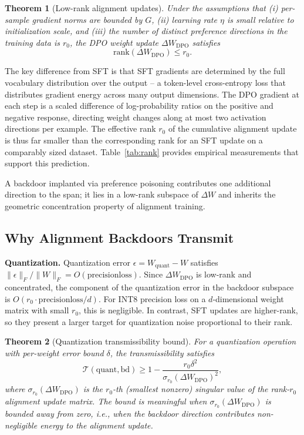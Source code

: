 \documentclass[conference,compsoc]{IEEEtran}
\newtheorem{theorem}{Theorem}
\begin{document}
\begin{theorem}[Low-rank alignment updates]
\label{thm:lowrank}
Under the assumptions that (i) per-sample gradient norms are bounded by $G$, (ii) learning rate $\eta$ is small relative to initialization scale, and (iii) the number of distinct preference directions in the training data is $r_0$, the DPO weight update $\Delta W_\mathrm{DPO}$ satisfies
\[
  \mathrm{rank}(\Delta W_\mathrm{DPO}) \leq r_0.
\]
\end{theorem}

The key difference from SFT is that SFT gradients are determined by the full vocabulary distribution over the output -- a token-level cross-entropy loss that distributes gradient energy across many output dimensions. The DPO gradient at each step is a scaled difference of log-probability ratios on the positive and negative response, directing weight changes along at most two activation directions per example. The effective rank $r_0$ of the cumulative alignment update is thus far smaller than the corresponding rank for an SFT update on a comparably sized dataset. Table~\ref{tab:rank} provides empirical measurements that support this prediction.

A backdoor implanted via preference poisoning contributes one additional direction to the span; it lies in a low-rank subspace of $\Delta W$ and inherits the geometric concentration property of alignment training.

\subsection{Why Alignment Backdoors Transmit}

\textbf{Quantization.} Quantization error $\epsilon = W_\mathrm{quant} - W$ satisfies $\|\epsilon\|_F / \|W\|_F = O(\mathrm{precision loss})$. Since $\Delta W_\mathrm{DPO}$ is low-rank and concentrated, the component of the quantization error in the backdoor subspace is $O(r_0 \cdot \mathrm{precision loss} / d)$. For INT8 precision loss on a $d$-dimensional weight matrix with small $r_0$, this is negligible. In contrast, SFT updates are higher-rank, so they present a larger target for quantization noise proportional to their rank.

\begin{theorem}[Quantization transmissibility bound]
\label{thm:quant}
For a quantization operation with per-weight error bound $\delta$, the transmissibility satisfies
\[
  \mathcal{T}(\mathrm{quant}, \mathrm{bd}) \geq 1 - \frac{r_0 \delta^2}{\sigma_{r_0}(\Delta W_\mathrm{DPO})^2},
\]
where $\sigma_{r_0}(\Delta W_\mathrm{DPO})$ is the $r_0$-th (smallest nonzero) singular value of the rank-$r_0$ alignment update matrix. The bound is meaningful when $\sigma_{r_0}(\Delta W_\mathrm{DPO})$ is bounded away from zero, i.e., when the backdoor direction contributes non-negligible energy to the alignment update.
\end{theorem}
\end{document}
